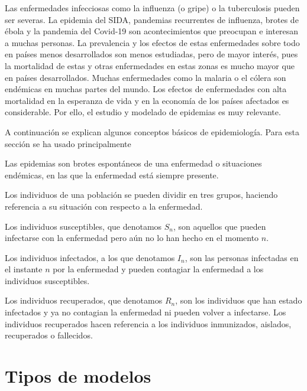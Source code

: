Las enfermedades infecciosas como la influenza (o gripe) o la tuberculosis pueden ser severas. La epidemia del SIDA, pandemias recurrentes de influenza, brotes de ébola y la pandemia del Covid-19 son acontecimientos que preocupan e interesan a muchas personas. La prevalencia y los efectos de estas enfermedades sobre todo en países menos desarrollados son menos estudiadas, pero de mayor interés, pues la mortalidad de estas y otras enfermedades en estas zonas es mucho mayor que en países desarrollados. Muchas enfermedades como la malaria o el cólera son endémicas en muchas partes del mundo. Los efectos de enfermedades con alta mortalidad en la esperanza de vida y en la economía de los países afectados es considerable. Por ello, el estudio y modelado de epidemias es muy relevante.

A continuación se explican algunos conceptos básicos de epidemiología. Para esta sección se ha usado principalmente \cite{brauerMathematicalModelsPopulation2012}

\begin{definition}
Las epidemias son brotes espontáneos de una enfermedad o situaciones endémicas, en las que la enfermedad está siempre presente.
\end{definition}

Los individuos de una población se pueden dividir en tres grupos, haciendo referencia a su situación con respecto a la enfermedad.

\begin{definition}
Los individuos susceptibles, que denotamos $S_n$, son aquellos que pueden infectarse con la enfermedad pero aún no lo han hecho en el momento $n$.
\end{definition}

\begin{definition}
Los individuos infectados, a los que denotamos $I_n$, son las personas infectadas en el instante $n$ por la enfermedad y pueden contagiar la enfermedad a los individuos susceptibles.
\end{definition}

\begin{definition}
Los individuos recuperados, que denotamos $R_n$, son los individuos que han estado infectados y ya no contagian la enfermedad ni pueden volver a infectarse.
Los individuos recuperados hacen referencia a los individuos inmunizados, aislados, recuperados o fallecidos.
\end{definition}

\section{Tipos de modelos}

